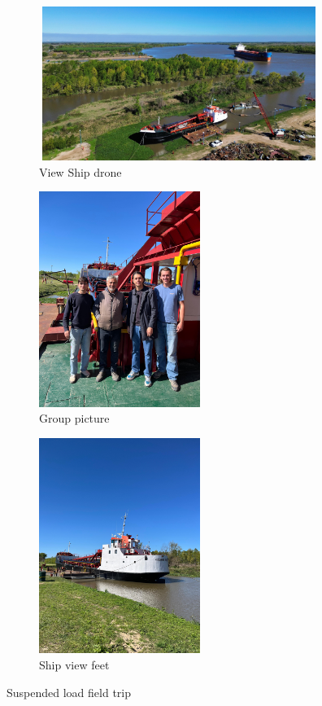 \begin{figure}[H]
    \centering
    \begin{subfigure}[b]{0.6\textwidth}
        \includegraphics[width= 10cm, height =5cm]{figures/appendixE/shiphor.jpg}
        \caption{View Ship drone}
        \label{fig:second}
    \end{subfigure}

    \vspace{0.5cm}

    \begin{subfigure}[b]{0.48\textwidth}
        \includegraphics[width=\linewidth, height=7cm]{figures/appendixE/groupdredger.jpg}
        \caption{Group picture}
        \label{fig:third}
    \end{subfigure}
    \hfill
    \begin{subfigure}[b]{0.48\textwidth}
        \includegraphics[width=\linewidth, height=7cm]{figures/appendixE/ship.jpg}
        \caption{Ship view feet}
        \label{fig:fourth}
    \end{subfigure}

    \caption{Suspended load field trip}
    \label{fig:all_four}
\end{figure}

